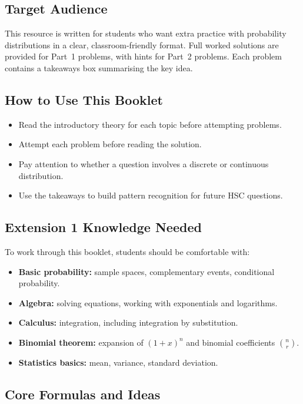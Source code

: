 \documentclass[12pt]{article}
\begin{document}
\subsection{Target Audience}
This resource is written for students who want extra practice with probability distributions in a clear, classroom-friendly format. Full worked solutions are provided for Part~1 problems, with hints for Part~2 problems. Each problem contains a takeaways box summarising the key idea.

\subsection{How to Use This Booklet}
\begin{itemize}[leftmargin=*]
  \item Read the introductory theory for each topic before attempting problems.
  \item Attempt each problem before reading the solution.
  \item Pay attention to whether a question involves a discrete or continuous distribution.
  \item Use the takeaways to build pattern recognition for future HSC questions.
\end{itemize}

\subsection{Extension 1 Knowledge Needed}
To work through this booklet, students should be comfortable with:
\begin{itemize}[leftmargin=*]
  \item \textbf{Basic probability:} sample spaces, complementary events, conditional probability.
  \item \textbf{Algebra:} solving equations, working with exponentials and logarithms.
  \item \textbf{Calculus:} integration, including integration by substitution.
  \item \textbf{Binomial theorem:} expansion of $(1+x)^n$ and binomial coefficients $\binom{n}{r}$.
  \item \textbf{Statistics basics:} mean, variance, standard deviation.
\end{itemize}

\subsection{Core Formulas and Ideas}
\end{document}
